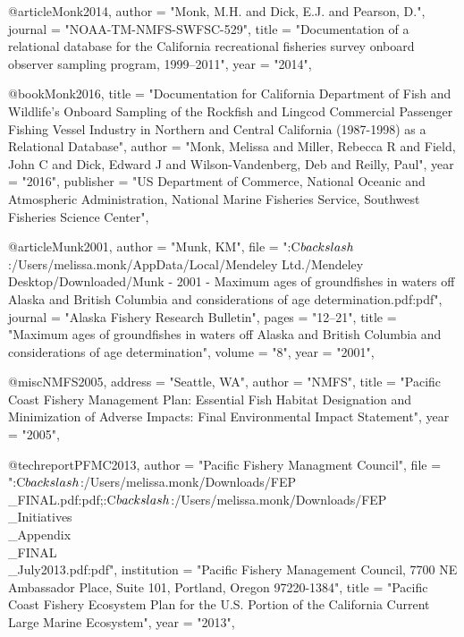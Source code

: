 @article{Monk2014,
    author = "{Monk, M.H. and Dick, E.J. and Pearson, D.}",
    journal = "{NOAA-TM-NMFS-SWFSC-529}",
    title = "{{Documentation of a relational database for the California recreational fisheries survey onboard observer sampling program, 1999--2011}}",
    year = "{2014}",
}

@book{Monk2016,
    title = "{Documentation for California Department of Fish and Wildlife's Onboard Sampling of the Rockfish and Lingcod Commercial Passenger Fishing Vessel Industry in Northern and Central California (1987-1998) as a Relational Database}",
    author = "{Monk, Melissa and Miller, Rebecca R and Field, John C and Dick, Edward J and Wilson-Vandenberg, Deb and Reilly, Paul}",
    year = "{2016}",
    publisher = "{US Department of Commerce, National Oceanic and Atmospheric Administration, National Marine Fisheries Service, Southwest Fisheries Science Center}",
}

@article{Munk2001,
    author = "{Munk, KM}",
    file = "{:C$\\backslash$:/Users/melissa.monk/AppData/Local/Mendeley Ltd./Mendeley Desktop/Downloaded/Munk - 2001 - Maximum ages of groundfishes in waters off Alaska and British Columbia and considerations of age determination.pdf:pdf}",
    journal = "{Alaska Fishery Research Bulletin}",
    pages = "{12--21}",
    title = "{{Maximum ages of groundfishes in waters off Alaska and British Columbia and considerations of age determination}}",
    volume = "{8}",
    year = "{2001}",
}

@misc{NMFS2005,
    address = "{Seattle, WA}",
    author = "{NMFS}",
    title = "{{Pacific Coast Fishery Management Plan: Essential Fish Habitat Designation and Minimization of Adverse Impacts: Final Environmental Impact Statement}}",
    year = "{2005}",
}

@techreport{PFMC2013,
    author = "{{Pacific Fishery Managment Council}}",
    file = "{:C$\\backslash$:/Users/melissa.monk/Downloads/FEP\\_FINAL.pdf:pdf;:C$\\backslash$:/Users/melissa.monk/Downloads/FEP\\_Initiatives\\_Appendix\\_FINAL\\_July2013.pdf:pdf}",
    institution = "{Pacific Fishery Management Council, 7700 NE Ambassador Place, Suite 101, Portland, Oregon 97220-1384}",
    title = "{{Pacific Coast Fishery Ecosystem Plan for the U.S. Portion of the California Current Large Marine Ecosystem}}",
    year = "{2013}",
}

